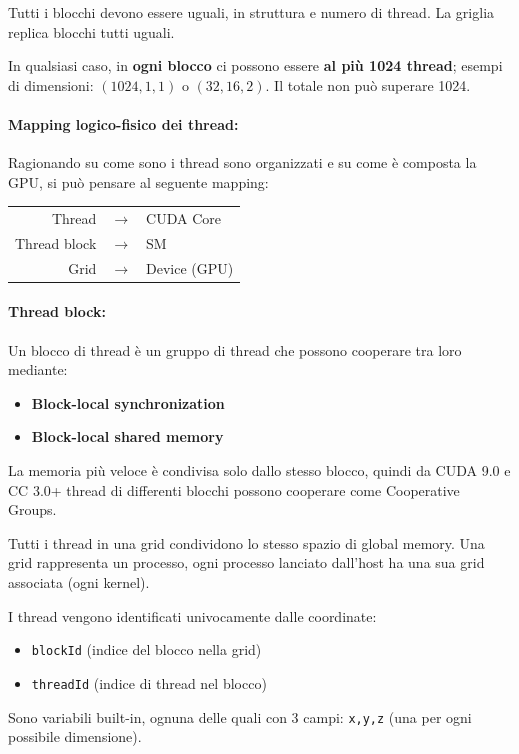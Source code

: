 Tutti i blocchi devono essere uguali, in struttura e numero di thread. La griglia replica blocchi tutti uguali.

In qualsiasi caso, in \textbf{ogni blocco} ci possono essere \textbf{al più 1024 thread}; esempi di dimensioni: $(1024, 1, 1)$  o $(32, 16, 2)$. Il totale non può superare 1024.

\paragraph{Mapping logico-fisico dei thread:} Ragionando su come sono i thread sono organizzati e su come è composta la GPU, si può pensare al seguente mapping:

\begin{tabular}{r c l}
	Thread & $\rightarrow$ & CUDA Core \\
	Thread block & $\rightarrow$ & SM \\
	Grid & $\rightarrow$ & Device (GPU)
\end{tabular}

\paragraph{Thread block:} Un blocco di thread è un gruppo di thread che possono cooperare tra loro mediante:
\begin{itemize}
	\item \textbf{Block-local synchronization}
	
	\item \textbf{Block-local shared memory}
\end{itemize}

La memoria più veloce è condivisa solo dallo stesso blocco, quindi da CUDA 9.0 e CC 3.0+ thread di differenti blocchi possono cooperare come Cooperative Groups.

Tutti i thread in una grid condividono lo stesso spazio di global memory. Una grid rappresenta un processo, ogni processo lanciato dall'host ha una sua grid associata (ogni kernel).

I thread vengono identificati univocamente dalle coordinate: 
\begin{itemize}
	\item \texttt{blockId} (indice del blocco nella grid)
	
	\item \texttt{threadId} (indice di thread nel blocco)
\end{itemize}

Sono variabili built-in, ognuna delle quali con 3 campi: \texttt{x,y,z} (una per ogni possibile dimensione).

